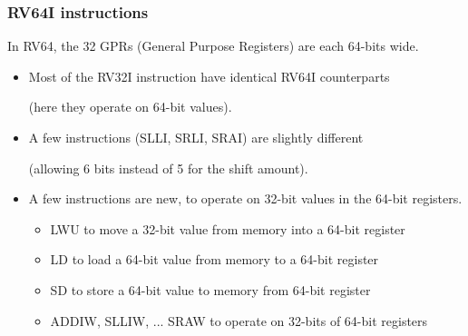 \begin{frame}
\frametitle{RV64I instructions}

In RV64, the 32 GPRs (General Purpose Registers) are each 64-bits wide.

\vspace{1ex}

\begin{itemize}

\item Most of the RV32I instruction have identical RV64I counterparts

  {\footnotesize (here they operate on 64-bit values).}

\item A few instructions (SLLI, SRLI, SRAI) are slightly different

  {\footnotesize (allowing 6 bits instead of 5 for the shift amount).}

\item A few instructions are new, to operate on 32-bit values in the
  64-bit registers.
  {\footnotesize
    \begin{itemize}
    \item LWU to move a 32-bit value from memory into a 64-bit register
    \item LD to load a 64-bit value from memory to a 64-bit register
    \item SD to store a 64-bit value to memory from 64-bit register
    \item ADDIW, SLLIW, ... SRAW to operate on 32-bits of 64-bit registers
    \end{itemize}}

\end{itemize}

\end{frame}






